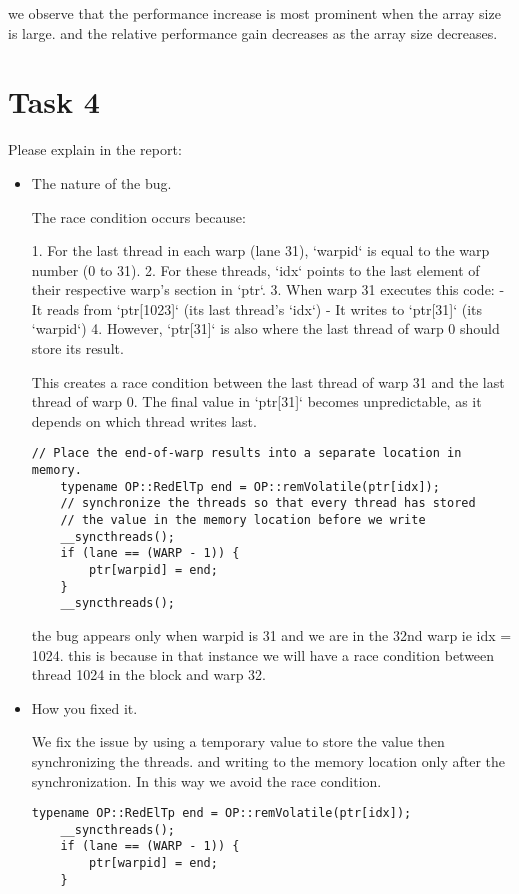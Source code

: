 \documentclass{article}
\begin{document}
  we observe that the performance increase is most prominent when the array size is large. and the relative performance gain decreases as the array size decreases.

\section{Task 4}

Please explain in the report:

\begin{itemize}
  \item The nature of the bug.
  
  The race condition occurs because:

  1. For the last thread in each warp (lane 31), `warpid` is equal to the warp number (0 to 31).
  2. For these threads, `idx` points to the last element of their respective warp's section in `ptr`.
  3. When warp 31 executes this code:
    - It reads from `ptr[1023]` (its last thread's `idx`)
    - It writes to `ptr[31]` (its `warpid`)
  4. However, `ptr[31]` is also where the last thread of warp 0 should store its result.

  This creates a race condition between the last thread of warp 31 and the last thread of warp 0. The final value in `ptr[31]` becomes unpredictable, as it depends on which thread writes last.


  \begin{lstlisting}[language=cuda]
    // Place the end-of-warp results into a separate location in memory.
    typename OP::RedElTp end = OP::remVolatile(ptr[idx]);
    // synchronize the threads so that every thread has stored 
    // the value in the memory location before we write
    __syncthreads();
    if (lane == (WARP - 1)) {
        ptr[warpid] = end;
    }
    __syncthreads();
  \end{lstlisting}

  the bug appears only when warpid is 31 and we are in the 32nd warp ie idx = 1024.
  this is because in that instance we will have a race condition between thread 1024 in the block 
  and warp 32. 

  \item How you fixed it.
  
  We fix the issue by using a temporary value to store the value then synchronizing the threads.
  and writing to the memory location only after the synchronization. In this way we avoid the race condition.

  \begin{lstlisting}[language=cuda]
    typename OP::RedElTp end = OP::remVolatile(ptr[idx]);
    __syncthreads();
    if (lane == (WARP - 1)) {
        ptr[warpid] = end;
    }
  \end{lstlisting}

\end{itemize}
\end{document}
